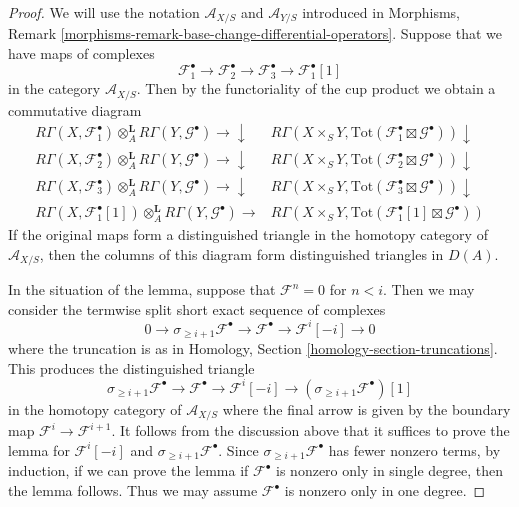 \begin{proof}

We will use the notation $\mathcal{A}_{X/S}$ and $\mathcal{A}_{Y/S}$
introduced in Morphisms, Remark
\ref{morphisms-remark-base-change-differential-operators}.
Suppose that we have maps of complexes
$$
\mathcal{F}_1^\bullet \to
\mathcal{F}_2^\bullet \to
\mathcal{F}_3^\bullet \to
\mathcal{F}_1^\bullet[1]
$$
in the category $\mathcal{A}_{X/S}$.
Then by the functoriality of the cup product
we obtain a commutative diagram
$$
\begin{array}{cc}R\Gamma(X, \mathcal{F}_1^\bullet)
\otimes_A^\mathbf{L}
R\Gamma(Y, \mathcal{G}^\bullet)
\longrightarrow\downarrow & R\Gamma(X \times_S Y,
\text{Tot}(\mathcal{F}_1^\bullet \boxtimes \mathcal{G}^\bullet)) \downarrow \\ R\Gamma(X, \mathcal{F}_2^\bullet)
\otimes_A^\mathbf{L}
R\Gamma(Y, \mathcal{G}^\bullet)
\longrightarrow\downarrow & R\Gamma(X \times_S Y,
\text{Tot}(\mathcal{F}_2^\bullet \boxtimes \mathcal{G}^\bullet)) \downarrow \\ R\Gamma(X, \mathcal{F}_3^\bullet)
\otimes_A^\mathbf{L}
R\Gamma(Y, \mathcal{G}^\bullet)
\longrightarrow\downarrow & R\Gamma(X \times_S Y,
\text{Tot}(\mathcal{F}_3^\bullet \boxtimes \mathcal{G}^\bullet)) \downarrow \\ R\Gamma(X, \mathcal{F}_1^\bullet[1])
\otimes_A^\mathbf{L}
R\Gamma(Y, \mathcal{G}^\bullet)
\longrightarrow & R\Gamma(X \times_S Y,
\text{Tot}(\mathcal{F}_1^\bullet[1] \boxtimes \mathcal{G}^\bullet))\end{array}
$$
If the original maps form a distinguished triangle in the homotopy category
of $\mathcal{A}_{X/S}$, then
the columns of this diagram form distinguished triangles in $D(A)$.

\medskip\noindent
In the situation of the lemma,
suppose that $\mathcal{F}^n = 0$ for $n < i$. Then we may consider the
termwise split short exact sequence of complexes
$$
0 \to \sigma_{\geq i + 1}\mathcal{F}^\bullet \to
\mathcal{F}^\bullet \to \mathcal{F}^i[-i] \to 0
$$
where the truncation is as in
Homology, Section \ref{homology-section-truncations}.
This produces the distinguished triangle
$$
\sigma_{\geq i + 1}\mathcal{F}^\bullet \to
\mathcal{F}^\bullet \to
\mathcal{F}^i[-i] \to
(\sigma_{\geq i + 1}\mathcal{F}^\bullet)[1]
$$
in the homotopy category of $\mathcal{A}_{X/S}$
where the final arrow is given by the boundary map
$\mathcal{F}^i \to \mathcal{F}^{i + 1}$.
It follows from the discussion above that it suffices to prove the lemma for
$\mathcal{F}^i[-i]$ and $\sigma_{\geq i + 1}\mathcal{F}^\bullet$.
Since $\sigma_{\geq i + 1}\mathcal{F}^\bullet$ has fewer nonzero
terms, by induction, if we can prove the lemma if $\mathcal{F}^\bullet$ is
nonzero only in single degree, then the lemma follows.
Thus we may assume $\mathcal{F}^\bullet$ is nonzero only in one degree.


\end{proof}
